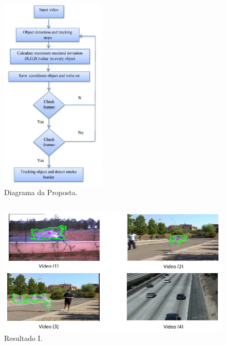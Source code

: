 \documentclass{beamer}
\begin{document}
\begin{frame}{}
\begin{columns}
		\begin{column}{0.6\textwidth}
			\begin{figure}[H]
				\centering
				\begin{center}
				\includegraphics[width=0.45\textwidth]{img/fig10-artigo9.png}
			  \caption{Diagrama da Proposta.}
				\label{fig:sar}
			  \end{center}
			\end{figure}
		\end{column}
	\end{columns}
\end{frame}


\begin{frame}{}
	\begin{figure}[H]
		\centering
		\begin{center}
		\includegraphics[width=.95\textwidth]{img/resultado1-artigo9.png}
		\caption{Resultado I.}
		\label{fig:sar}
		\end{center}
	\end{figure}
\end{frame}
\end{document}

